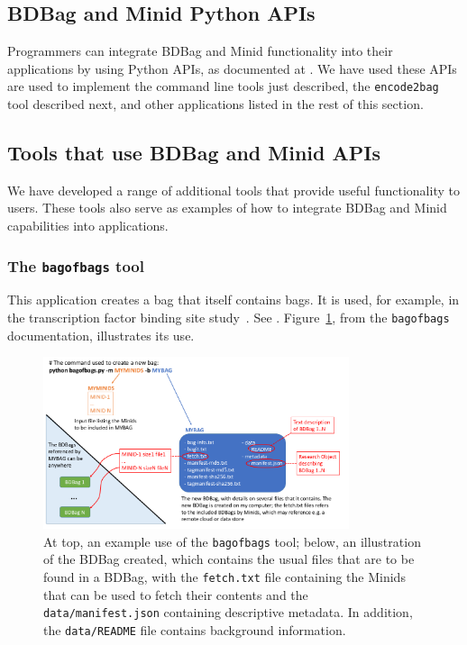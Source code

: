 \documentclass[11pt]{article}
\begin{document}
\subsection{BDBag and Minid Python APIs} 

Programmers can integrate BDBag and Minid functionality into their applications by using
Python APIs, as documented at .
We have used these APIs are used to implement the command line tools just described,
the \texttt{encode2bag} tool described next, and other applications listed in the rest of this section. 


\subsection{Tools that use BDBag and Minid APIs}

We have developed a range of additional tools that provide useful functionality to users.
These tools also serve as examples of how to integrate BDBag and Minid
capabilities into applications.

\subsubsection{The \texttt{bagofbags} tool}

This application creates a bag that itself contains bags.
It is used, for example, in the transcription factor
binding site study~\cite{madduri2018reproducible}.
See .
Figure~\ref{fig:bob}, from the \texttt{bagofbags} documentation, illustrates its use.

\begin{figure}
\centering
\includegraphics[width=0.8\textwidth]{figs/MetaBags.png}
\caption{At top, an example use of the \texttt{bagofbags} tool; below, an illustration of the BDBag created, which contains the usual files that are to be found in a BDBag, with the \texttt{fetch.txt} file containing the Minids that can be used to fetch their contents and the \texttt{data/manifest.json} containing descriptive metadata. In addition, the \texttt{data/README} file contains background information.\label{fig:bob}}
\end{figure}
\end{document}
